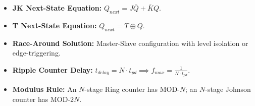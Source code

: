 \begin{takeawaybox}
\begin{itemize}
    \item \textbf{JK Next-State Equation:} $Q_{next} = J\overline{Q} + \overline{K}Q$.
    \item \textbf{T Next-State Equation:} $Q_{next} = T \oplus Q$.
    \item \textbf{Race-Around Solution:} Master-Slave configuration with level isolation or edge-triggering.
    \item \textbf{Ripple Counter Delay:} $t_{delay} = N \cdot t_{pd} \implies f_{max} = \frac{1}{N \cdot t_{pd}}$.
    \item \textbf{Modulus Rule:} An $N$-stage Ring counter has MOD-$N$; an $N$-stage Johnson counter has MOD-$2N$.
\end{itemize}
\end{takeawaybox}
